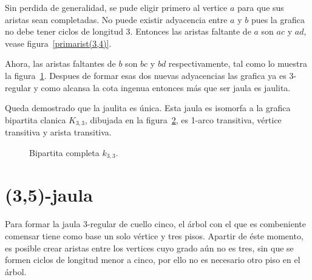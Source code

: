 \documentclass[11pt]{book}
\theoremstyle{definition}
\begin{document}
Sin perdida de generalidad, se pude eligir primero al vertice $a$ para que sus
aristas sean completadas. No puede existir adyacencia entre $a$ y $b$
pues la grafica no debe tener ciclos de longitud 3. Entonces las
aristas faltante de $a$ son $ac$ y $ad$, vease
figura~\ref{primarist(3,4)}.

\begin{figure}[htb]
  \centering
  \caption{} \label{jaula(3,4)}
\end{figure}

Ahora, las aristas faltantes de $b$ son  $bc$
y $bd$ respectivamente, tal como lo muestra la
figura~\ref{jaula(3,4)}. Despues de formar esas dos nuevas adyacencias
las grafica ya es 3-regular y como alcansa la cota ingenua entonces
más que ser jaula es
jaulita.


Queda demostrado que la jaulita es única. Esta jaula es isomorfa a la
grafica bipartita clanica  $K_{3,3}$,
dibujada en la figura~\ref{K_3,3}, es 1-arco transitiva, vértice
transitiva y arista transitiva.

\begin{figure}[htb]
  \centering
  \caption{Bipartita completa $k_{3,3}$.} \label{K_3,3}
\end{figure}


\section{(3,5)-jaula}

Para formar la jaula $3$-regular de cuello cinco, el árbol con el que
es combeniente comensar tiene como base un solo vértice
y tres pisos. Apartir de éste momento, es posible crear aristas entre
los vertices cuyo grado aún no es tres, sin que se formen ciclos de
longitud menor a cinco, por ello no es necesario otro piso en el árbol.
\end{document}
